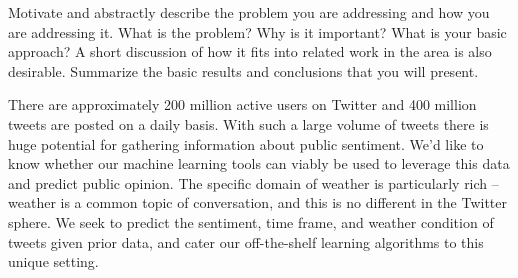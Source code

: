 Motivate and abstractly describe the problem you are addressing and how you are addressing it. What is the problem? Why is it important? What is your basic approach? A short discussion of how it fits into related work in the area is also desirable. Summarize the basic results and conclusions that you will present. 


There are approximately 200 million active users on Twitter and 400 million tweets are posted on a daily basis. With such a large volume of tweets there is huge potential for gathering information about public sentiment. We’d like to know whether our machine learning tools can  viably be used to leverage this data and predict public opinion. The specific domain of weather is particularly rich – weather is a common topic of conversation, and this is no different in the Twitter sphere. We seek to predict the sentiment, time frame, and weather condition of tweets given prior data, and cater our off-the-shelf learning algorithms to this unique setting.

